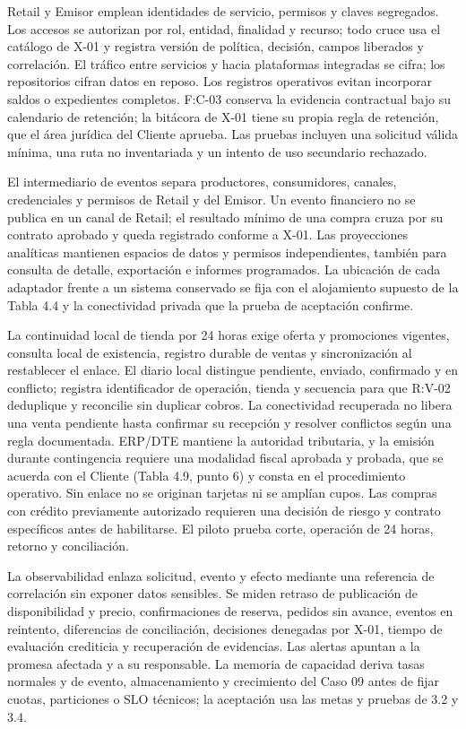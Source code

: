 \documentclass[11pt]{article}
\begin{document}
Retail y Emisor emplean identidades de servicio, permisos y claves segregados. Los accesos se autorizan por rol, entidad, finalidad y recurso; todo cruce usa el catálogo de X-01 y registra versión de política, decisión, campos liberados y correlación. El tráfico entre servicios y hacia plataformas integradas se cifra; los repositorios cifran datos en reposo. Los registros operativos evitan incorporar saldos o expedientes completos. F:C-03 conserva la evidencia contractual bajo su calendario de retención; la bitácora de X-01 tiene su propia regla de retención, que el área jurídica del Cliente aprueba. Las pruebas incluyen una solicitud válida mínima, una ruta no inventariada y un intento de uso secundario rechazado.

El intermediario de eventos separa productores, consumidores, canales, credenciales y permisos de Retail y del Emisor. Un evento financiero no se publica en un canal de Retail; el resultado mínimo de una compra cruza por su contrato aprobado y queda registrado conforme a X-01. Las proyecciones analíticas mantienen espacios de datos y permisos independientes, también para consulta de detalle, exportación e informes programados. La ubicación de cada adaptador frente a un sistema conservado se fija con el alojamiento supuesto de la Tabla 4.4 y la conectividad privada que la prueba de aceptación confirme.

La continuidad local de tienda por 24 horas exige oferta y promociones vigentes, consulta local de existencia, registro durable de ventas y sincronización al restablecer el enlace. El diario local distingue pendiente, enviado, confirmado y en conflicto; registra identificador de operación, tienda y secuencia para que R:V-02 deduplique y reconcilie sin duplicar cobros. La conectividad recuperada no libera una venta pendiente hasta confirmar su recepción y resolver conflictos según una regla documentada. ERP/DTE mantiene la autoridad tributaria, y la emisión durante contingencia requiere una modalidad fiscal aprobada y probada, que se acuerda con el Cliente (Tabla 4.9, punto 6) y consta en el procedimiento operativo. Sin enlace no se originan tarjetas ni se amplían cupos. Las compras con crédito previamente autorizado requieren una decisión de riesgo y contrato específicos antes de habilitarse. El piloto prueba corte, operación de 24 horas, retorno y conciliación.

La observabilidad enlaza solicitud, evento y efecto mediante una referencia de correlación sin exponer datos sensibles. Se miden retraso de publicación de disponibilidad y precio, confirmaciones de reserva, pedidos sin avance, eventos en reintento, diferencias de conciliación, decisiones denegadas por X-01, tiempo de evaluación crediticia y recuperación de evidencias. Las alertas apuntan a la promesa afectada y a su responsable. La memoria de capacidad deriva tasas normales y de evento, almacenamiento y crecimiento del Caso 09 antes de fijar cuotas, particiones o SLO técnicos; la aceptación usa las metas y pruebas de 3.2 y 3.4.
\end{document}
